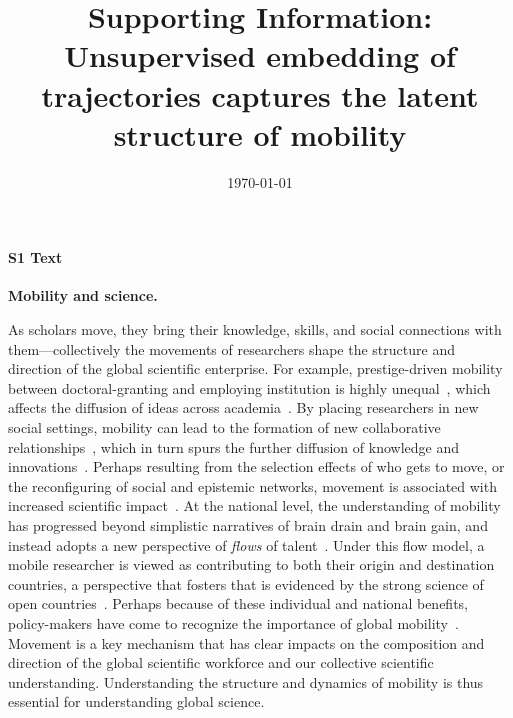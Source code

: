 \documentclass[12pt]{article} %
\newcommand{\beginsupplement}{%
        \setcounter{table}{0}
        \renewcommand{\thetable}{S\arabic{table}}%
        \setcounter{figure}{0}
        \renewcommand{\thefigure}{S\arabic{figure}}%
     }
\begin{document}

\title{Supporting Information: Unsupervised embedding of trajectories captures the latent structure of mobility} %
\date{\today}
\maketitle %

\beginsupplement

%
%
\paragraph*{S1 Text}
\label{si:text:mobility_science}
{\bf Mobility and science.}

As scholars move, they bring their knowledge, skills, and social connections with them---collectively the movements of researchers shape the structure and direction of the global scientific enterprise.
For example, prestige-driven mobility between doctoral-granting and employing institution is highly unequal~\autocite{clauset2015hierarchy, deville2014career}, which affects the diffusion of ideas across academia~\autocite{morgan2018prestige}.
By placing researchers in new social settings, mobility can lead to the formation of new collaborative relationships~\autocite{rodrigues2016mobility}, which in turn spurs the further diffusion of knowledge and innovations~\autocite{braunerhjelm2020labor, azoulay2011diffusion, kaiser2018innovation, armano2017innovation}.
Perhaps resulting from the selection effects of who gets to move, or the reconfiguring of social and epistemic networks, movement is associated with increased scientific impact~\autocite{sugimoto2017mostimpact, petersen2018multiscale, jonkers2013return, franzoni2014advantage}.
At the national level, the understanding of mobility has progressed beyond simplistic narratives of brain drain and brain gain, and instead adopts a new perspective of \textit{flows} of talent~\autocite{meyer2001network, ioannidis2014braindrain, gaillard1998circulation}.
Under this flow model, a mobile researcher is viewed as contributing to both their origin and destination countries, a perspective that fosters that is evidenced by the strong science of open countries~\autocite{wagner2017open}.
Perhaps because of these individual and national benefits, policy-makers have come to recognize the importance of global mobility~\autocite{box2008competition, oecd2010innovation}.
Movement is a key mechanism that has clear impacts on the composition and direction of the global scientific workforce and our collective scientific understanding.
Understanding the structure and dynamics of mobility is thus essential for understanding global science.
\end{document}

